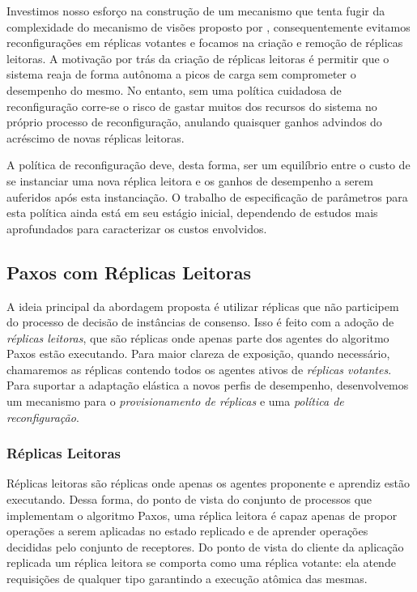 Investimos nosso esforço na construção de um mecanismo que tenta fugir da complexidade do
mecanismo de visões proposto por , consequentemente evitamos
reconfigurações em réplicas votantes e focamos na criação e remoção de réplicas leitoras.
A motivação por trás da criação de réplicas leitoras é permitir que o sistema reaja de
forma autônoma a picos de carga sem comprometer o desempenho do mesmo. No entanto, sem uma
política cuidadosa de reconfiguração corre-se o risco de gastar muitos dos recursos do
sistema no próprio processo de reconfiguração, anulando quaisquer ganhos advindos do
acréscimo de novas réplicas leitoras.

A política de reconfiguração deve, desta forma, ser um equilíbrio entre o custo de se
instanciar uma nova réplica leitora e os ganhos de desempenho a serem auferidos após esta
instanciação. O trabalho de especificação de parâmetros para esta política ainda está em
seu estágio inicial, dependendo de estudos mais aprofundados para caracterizar os custos
envolvidos.

\subsection{Paxos com Réplicas Leitoras}\label{sec:replicas_leitoras}

A ideia principal da abordagem proposta é utilizar réplicas que não participem do processo
de decisão de instâncias de consenso. Isso é feito com a adoção de \emph{réplicas
leitoras}, que são réplicas onde apenas parte dos agentes do algoritmo Paxos estão
executando. Para maior clareza de exposição, quando necessário, chamaremos as réplicas
contendo todos os agentes ativos de \emph{réplicas votantes}. Para suportar a adaptação
elástica a novos perfis de desempenho, desenvolvemos um mecanismo para o
\emph{provisionamento de réplicas} e uma \emph{política de reconfiguração}.

\subsubsection{Réplicas Leitoras}

Réplicas leitoras são réplicas onde apenas os agentes proponente e aprendiz estão
executando. Dessa forma, do ponto de vista do conjunto de processos que implementam o
algoritmo Paxos, uma réplica leitora é capaz apenas de propor operações a serem aplicadas
no estado replicado e de aprender operações decididas pelo conjunto de receptores. Do
ponto de vista do cliente da aplicação replicada um réplica leitora se comporta como uma
réplica votante: ela atende requisições de qualquer tipo garantindo a execução atômica das
mesmas.

